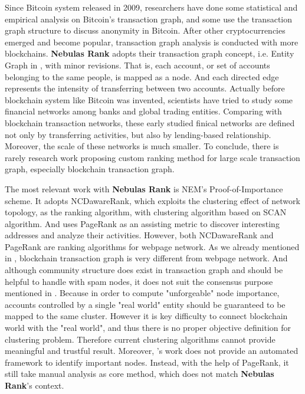 Since Bitcoin\cite{Nakamoto2008} system released in 2009, researchers have done some statistical and empirical analysis on Bitcoin's transaction graph\cite{Ron}\cite{Haslhofer}\cite{NielKondor2014}\cite{Baumann2014}, and some use the transaction graph structure to discuss anonymity in Bitcoin\cite{Meiklejohn2013}\cite{Ober2013}\cite{pham2016anomaly}\cite{Fleder2015}\cite{Ferrin2015}. After other cryptocurrencies emerged and become popular, transaction graph analysis is conducted with more blockchains\cite{Chang2017}\cite{Anderson2016}. \textbf{Nebulas Rank} adopts their transaction graph concept, i.e. Entity Graph in \cite{Tschorsch2015}, with minor revisions. That is, each account, or set of accounts belonging to the same people, is mapped as a node. And each directed edge represents the intensity of transferring between two accounts. Actually before blockchain system like Bitcoin was invented, scientists have tried to study some financial networks among banks and global trading entities\cite{propper2008towards}\cite{Boss2004}\cite{Serrano2007}\cite{Bech2008}\cite{Fagiolo2009}\cite{Morten2006}\cite{Boss2004a}\cite{Krempel2002}\cite{Serrano2003}. Comparing with blockchain transaction networks, these early studied finical networks are defined not only by transferring activities, but also by lending-based relationship. Moreover, the scale of these networks is much smaller. To conclude, there is rarely research work proposing custom ranking method for large scale transaction graph, especially blockchain transaction graph.

The most relevant work with \textbf{Nebulas Rank} is NEM\cite{nem}'s Proof-of-Importance scheme. It adopts NCDawareRank\cite{Nikolakopoulos2013}, which exploits the clustering effect of network topology, as the ranking algorithm, with clustering algorithm based on SCAN algorithm\cite{xu2007scan}\cite{shiokawa2015scan}\cite{chang2017mathsf}. And \textcite{Fleder2015} uses PageRank\cite{Brin2010}\cite{page1999pagerank} as an assisting metric to discover interesting addresses and analyze their activities. However, both NCDawareRank and PageRank are ranking algorithms for webpage network. As we already mentioned in , blockchain transaction graph is very different from webpage network. And although community structure does exist in transaction graph and should be helpful to handle with spam nodes, it does not suit the consensus purpose mentioned in . Because in order to compute "unforgeable" node importance, accounts controlled by a single "real world" entity should be guaranteed to be mapped to the same cluster. However it is key difficulty to connect blockchain world with the "real world", and thus there is no proper objective definition for clustering problem. Therefore current clustering algorithms cannot provide meaningful and trustful result. Moreover, \cite{Fleder2015}'s work does not provide an automated framework to identify important nodes. Instead, with the help of PageRank, it still take manual analysis as core method, which does not match \textbf{Nebulas Rank}'s context.

